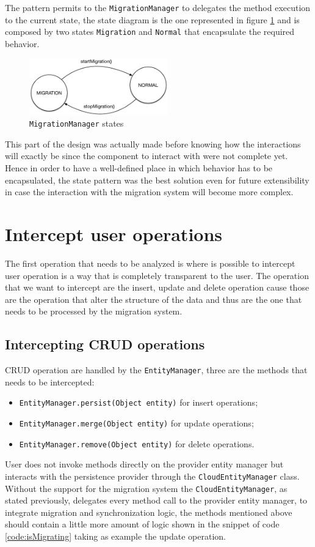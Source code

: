\noindent The pattern permits to the \texttt{MigrationManager} to delegates the method execution to the current state, the state diagram is the one represented in figure \ref{fig:migration-fsa} and is composed by two states \texttt{Migration} and \texttt{Normal} that encapsulate the required behavior.
    
\begin{figure}[tbh]
  \centering
  \includegraphics[width=6cm]{images/migration_fsa}
  \caption{\texttt{MigrationManager} states}
  \label{fig:migration-fsa}
\end{figure} 

\noindent This part of the design was actually made before knowing how the interactions will exactly be since the component to interact with were not complete yet. Hence in order to have a well-defined place in which behavior has to be encapsulated, the state pattern was the best solution even for future extensibility in case the interaction with the migration system will become more complex.  

\section{Intercept user operations}
The first operation that needs to be analyzed is where is possible to intercept user operation is a way that is completely transparent to the user.
The operation that we want to intercept are the insert, update and delete operation cause those are the operation that alter the structure of the data and thus are the one that needs to be processed by the migration system.

\subsection{Intercepting CRUD operations}
CRUD operation are handled by the \texttt{EntityManager}, three are the methods that needs to be intercepted:
\begin{itemize}
\item \texttt{EntityManager.persist(Object entity)} for insert operations;
\item \texttt{EntityManager.merge(Object entity)} for update operations;
\item \texttt{EntityManager.remove(Object entity)} for delete operations.
\end{itemize}
\noindent User does not invoke methods directly on the provider entity manager but interacts with the persistence provider through the \texttt{CloudEntityManager} class. Without the support for the migration system the \texttt{CloudEntityManager}, as stated previously, delegates every method call to the provider entity manager, to integrate migration and synchronization logic, the methods mentioned above should contain a little more amount of logic shown in the snippet of code \ref{code:isMigrating} taking as example the update operation.

